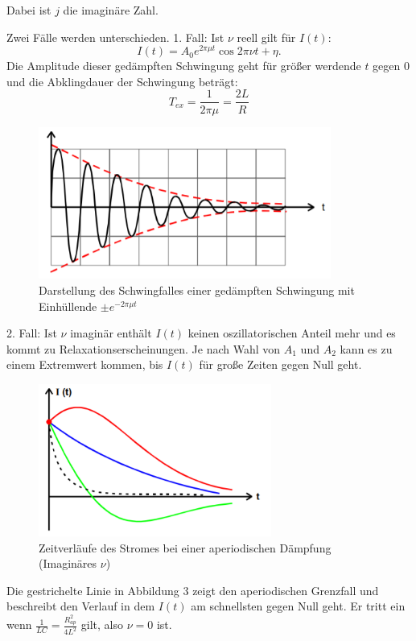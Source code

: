 Dabei ist $j$ die imaginäre Zahl.

Zwei Fälle werden unterschieden.
1. Fall: Ist $\nu$ reell gilt für $I(t)$:
\begin{equation}
  I(t) = A_0 e^{2\pi \mu t} \cos{2\pi \nu t + \eta}.
\end{equation}
Die Amplitude dieser gedämpften Schwingung geht für größer werdende $t$ gegen $0$ und die
Abklingdauer der Schwingung beträgt:
\begin{equation}
  T_{ex} =\frac{1}{2\pi \mu} = \frac{2L}{R}
\end{equation}

\begin{figure}[H]
  \centering
  \includegraphics[height=5cm]{schwingfall.PNG}
  \caption{Darstellung des Schwingfalles einer gedämpften Schwingung mit Einhüllende $\pm e^{-2\pi \mu t}$}
  \label{fig:schwingfall}
\end{figure}

2. Fall: Ist $\nu$ imaginär enthält $I(t)$ keinen oszillatorischen Anteil mehr und es kommt
zu Relaxationserscheinungen. Je nach Wahl von $A_1$ und $A_2$ kann es zu einem Extremwert kommen, bis
$I(t)$ für große Zeiten gegen Null geht.

\begin{figure}[H]
  \centering
  \includegraphics[height=5cm]{grenzfall.PNG}
  \caption{Zeitverläufe des Stromes bei einer aperiodischen Dämpfung (Imaginäres $\nu$)}
  \label{fig:grenzfall}
\end{figure}

Die gestrichelte Linie in Abbildung 3 zeigt den aperiodischen Grenzfall und beschreibt den Verlauf
in dem $I(t)$ am schnellsten gegen Null geht. Er tritt ein wenn $\frac{1}{LC}=\frac{R_{ap}^2}{4L^2}$ gilt, also $\nu = 0$ ist.


